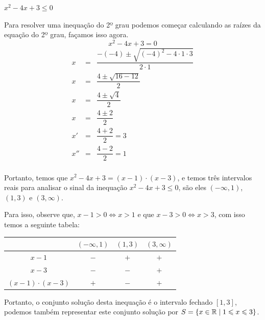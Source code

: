  \begin{exem}
 $x^2-4x+3 \leqslant 0$
 
 Para resolver uma inequação do 2º grau podemos começar calculando as raízes da equação do 2º grau, façamos isso agora.
\begin{equation}
x^2-4x+3 = 0
\end{equation}
 \begin{eqnarray*}
 x &=& \dfrac{-(-4) \pm \sqrt{(-4)^2 - 4 \cdot 1 \cdot 3}}{2 \cdot 1} \\
 x &=& \dfrac{4 \pm \sqrt{16 - 12}}{2} \\
 x &=& \dfrac{4 \pm \sqrt{4}}{2} \\
 x &=& \dfrac{4 \pm 2}{2} \\
 x' &=& \dfrac{4 + 2}{2} = 3 \ \\
 x'' &=& \dfrac{4 - 2}{2} = 1 \\
 \end{eqnarray*}
 
 Portanto, temos que $x^2-4x+3= (x-1) \cdot (x-3)$, e temos três intervalos reais para analisar o sinal da inequação $x^2-4x+3 \leqslant 0$, são eles $(-\infty, 1)$, $(1, 3)$ e $(3, \infty)$. 
 
 Para isso, observe que, $x-1> 0 \Leftrightarrow x> 1$ e que $x-3> 0 \Leftrightarrow x> 3$, com isso temos a seguinte tabela:
 
 \begin{table}[H]
 \centering
 \begin{tabular}{|c|c|c|c|} \hline
 \rowcolor{cinza}
         & $(-\infty, 1)$ & $(1, 3)$ & $(3, \infty)$ \\ \hline
 $x - 1$ & $-$ & $+$ & $+$ \\ \hline
 $x - 3$ & $-$ & $-$ & $+$ \\ \hline
 $(x-1) \cdot (x-3)$ & $+$ & $-$ & $+$ \\ \hline
 \end{tabular}
 \end{table}
 
 Portanto, o conjunto solução desta inequação é o intervalo fechado $[1, 3]$, podemos também representar este conjunto solução por $S= \left\{ x \in \mathbb{R} \mid 1 \leqslant x \leqslant 3 \right\}$.
 \end{exem}
 
